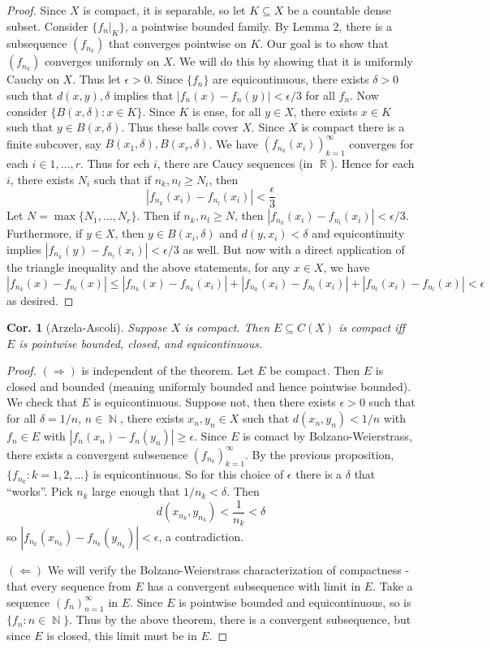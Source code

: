 \documentclass[12pt, a4paper]{book}
\DeclareMathOperator{\N}{\mathbb{N}}
\DeclareMathOperator{\R}{\mathbb{R}}
\newtheorem{corollary}[theorem]{Cor.}
\theoremstyle{nonumberplain}
\newtheorem{proof}{Proof}
\begin{document}
\begin{proof}
    Since $X$ is compact, it is separable, so let $K\subseteq X$ be a countable dense subset.
    Consider $\{f_n|_K\}$, a pointwise bounded family.
    By Lemma 2, there is a subsequence $(f_{n_k})$ that converges pointwise on $K$.
    Our goal is to show that $(f_{n_k})$ converges uniformly on $X$.
    We will do this by showing that it is uniformly Cauchy on $X$.
    Thus let $\epsilon>0$.
    Since $\{f_n\}$ are equicontinuous, there exists $\delta>0$ such that $d(x,y),\delta$ implies that $|f_n(x)-f_n(y)|<\epsilon/3$ for all $f_n$.
    Now consider $\{B(x,\delta):x\in K\}$.
    Since $K$ is ense, for all $y\in X$, there exists $x\in K$ such that $y\in B(x,\delta)$.
    Thus these balls cover $X$.
    Since $X$ is compact there is a finite subcover, say $B(x_1,\delta),B(x_r,\delta)$.
    We have $(f_{n_k}(x_i))_{k=1}^\infty$ converges for each $i\in 1,\ldots,r$.
    Thus for ech $i$, there are Caucy sequences (in $\R$).
    Hence for each $i$, there exists $N_i$ such that if $n_k,n_l\geq N_i$, then
    \[|f_{n_k}(x_i)-f_{n_l}(x_i)|<\frac{\epsilon}{3}\]
    Let $N=\max\{N_1,\ldots,N_r\}$.
    Then if $n_k,n_l\geq N$, then $|f_{n_k}(x_i)-f_{n_l}(x_i)|<\epsilon/3$.
    Furthermore, if $y\in X$, then $y\in B(x_i,\delta)$ and $d(y,x_i)<\delta$ and equicontinuity implies $|f_{n_k}(y)-f_{n_l}(x_i)|<\epsilon/3$ as well.
    But now with a direct application of the triangle inequality and the above statements, for any $x\in X$, we have
    \[|f_{n_k}(x)-f_{n_l}(x)|\leq |f_{n_k}(x)-f_{n_k}(x_i)|+|f_{n_k}(x_i)-f_{n_l}(x_i)|+|f_{n_l}(x_i)-f_{n_l}(x)|<\epsilon\]
    as desired.
\end{proof}
\begin{corollary}[Arzela-Ascoli]
    Suppose $X$ is compact.
    Then $E\subseteq C(X)$ is compact iff $E$ is pointwise bounded, closed, and equicontinuous.
\end{corollary}
\begin{proof}
    $(\Rightarrow)$ is independent of the theorem.
    Let $E$ be compact.
    Then $E$ is closed and bounded (meaning uniformly bounded and hence pointwise bounded).
    We check that $E$ is equicontinuous.
    Suppose not, then there exists $\epsilon>0$ such that for all $\delta=1/n$, $n\in\N$, there exists $x_n,y_n\in X$ such that $d(x_n,y_n)<1/n$ with $f_n\in E$ with $|f_n(x_n)-f_n(y_n)|\geq\epsilon$.
    Since $E$ is comact by Bolzano-Weierstrass, there exists a convergent subseuence $(f_{n_k})_{k=1}^\infty$.
    By the previous proposition, $\{f_{n_k}:k=1,2,\ldots\}$ is equicontinuous.
    So for this choice of $\epsilon$ there is a $\delta$ that ``works''. Pick $n_k$ large enough that $1/n_k<\delta$. Then
    \[d(x_{n_k},y_{n_k})<\frac{1}{n_k}<\delta\]
    so $|f_{n_k}(x_{n_k})-f_{n_k}(y_{n_k})|<\epsilon$, a contradiction.

    $(\Leftarrow)$ We will verify the Bolzano-Weierstrass characterization of compactness - that every sequence from $E$ has a convergent subsequence with limit in $E$.
    Take a sequence $(f_n)_{n=1}^\infty$ in $E$.
    Since $E$ is pointwise bounded and equicontinuous, so is $\{f_n:n\in\N\}$.
    Thus by the above theorem, there is a convergent subsequence, but since $E$ is closed, this limit must be in $E$.
\end{proof}
\end{document}
